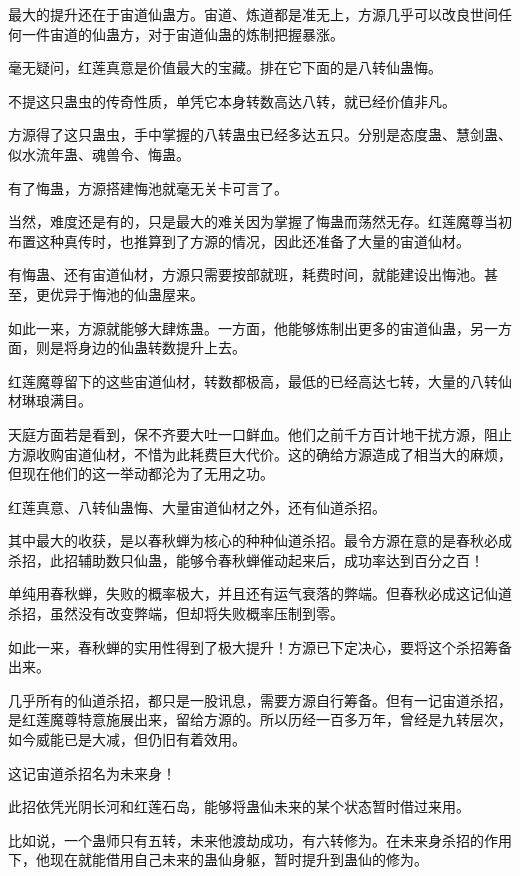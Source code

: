 \begin{this_body}
最大的提升还在于宙道仙蛊方。宙道、炼道都是准无上，方源几乎可以改良世间任何一件宙道的仙蛊方，对于宙道仙蛊的炼制把握暴涨。

毫无疑问，红莲真意是价值最大的宝藏。排在它下面的是八转仙蛊悔。

不提这只蛊虫的传奇性质，单凭它本身转数高达八转，就已经价值非凡。

方源得了这只蛊虫，手中掌握的八转蛊虫已经多达五只。分别是态度蛊、慧剑蛊、似水流年蛊、魂兽令、悔蛊。

有了悔蛊，方源搭建悔池就毫无关卡可言了。

当然，难度还是有的，只是最大的难关因为掌握了悔蛊而荡然无存。红莲魔尊当初布置这种真传时，也推算到了方源的情况，因此还准备了大量的宙道仙材。

有悔蛊、还有宙道仙材，方源只需要按部就班，耗费时间，就能建设出悔池。甚至，更优异于悔池的仙蛊屋来。

如此一来，方源就能够大肆炼蛊。一方面，他能够炼制出更多的宙道仙蛊，另一方面，则是将身边的仙蛊转数提升上去。

红莲魔尊留下的这些宙道仙材，转数都极高，最低的已经高达七转，大量的八转仙材琳琅满目。

天庭方面若是看到，保不齐要大吐一口鲜血。他们之前千方百计地干扰方源，阻止方源收购宙道仙材，不惜为此耗费巨大代价。这的确给方源造成了相当大的麻烦，但现在他们的这一举动都沦为了无用之功。

红莲真意、八转仙蛊悔、大量宙道仙材之外，还有仙道杀招。

其中最大的收获，是以春秋蝉为核心的种种仙道杀招。最令方源在意的是春秋必成杀招，此招辅助数只仙蛊，能够令春秋蝉催动起来后，成功率达到百分之百！

单纯用春秋蝉，失败的概率极大，并且还有运气衰落的弊端。但春秋必成这记仙道杀招，虽然没有改变弊端，但却将失败概率压制到零。

如此一来，春秋蝉的实用性得到了极大提升！方源已下定决心，要将这个杀招筹备出来。

几乎所有的仙道杀招，都只是一股讯息，需要方源自行筹备。但有一记宙道杀招，是红莲魔尊特意施展出来，留给方源的。所以历经一百多万年，曾经是九转层次，如今威能已是大减，但仍旧有着效用。

这记宙道杀招名为未来身！

此招依凭光阴长河和红莲石岛，能够将蛊仙未来的某个状态暂时借过来用。

比如说，一个蛊师只有五转，未来他渡劫成功，有六转修为。在未来身杀招的作用下，他现在就能借用自己未来的蛊仙身躯，暂时提升到蛊仙的修为。


\end{this_body}
